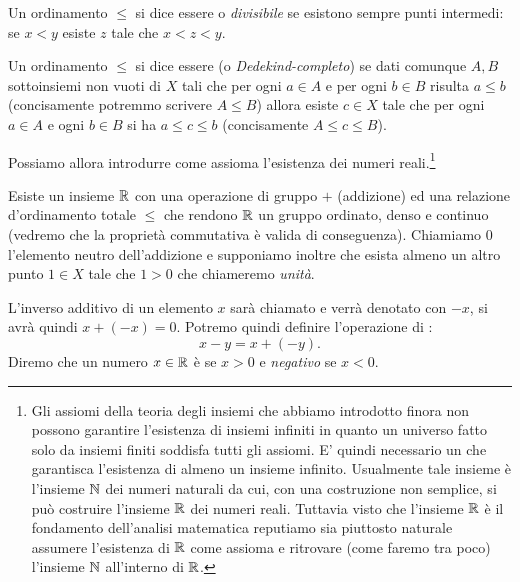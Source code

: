 \begin{definition}
  Un ordinamento $\le$ si dice essere
   o \emph{divisibile} 
  se esistono sempre punti intermedi:
  se $x<y$ esiste $z$ tale che $x < z < y$.
\end{definition}
  
\begin{definition}
  Un ordinamento $\le$ si dice essere
  (o \emph{Dedekind-completo})
  se dati comunque $A,B$ sottoinsiemi non vuoti di $X$
    tali che per ogni $a\in A$ e per ogni $b\in B$ risulta $a\le b$
    (concisamente potremmo scrivere $A\le B$)
    allora esiste $c\in X$ tale che per ogni $a\in A$ e ogni $b\in B$ 
    si ha $a\le c \le b$ (concisamente $A\le c \le B$).
\end{definition}
  
Possiamo allora introdurre come assioma l'esistenza dei 
numeri reali.\footnote{%
Gli assiomi della teoria degli insiemi che abbiamo introdotto finora 
non possono garantire l'esistenza di insiemi infiniti in quanto un 
universo fatto solo da insiemi finiti soddisfa tutti gli assiomi.
E' quindi necessario un  che garantisca 
l'esistenza di almeno un insieme infinito.
Usualmente tale insieme è l'insieme $\mathbb N$ dei numeri naturali da cui,
con una costruzione non semplice, si può costruire l'insieme $\mathbb R$ 
dei numeri reali. 
Tuttavia visto che l'insieme $\mathbb R$ è il fondamento dell'analisi matematica 
reputiamo sia piuttosto naturale assumere l'esistenza di $\mathbb R$ come assioma 
e ritrovare (come faremo tra poco) l'insieme $\mathbb N$ all'interno di $\mathbb R$.
}

\begin{axiom}
  Esiste un insieme $\mathbb R$ con una operazione di gruppo $+$ (addizione) 
  ed una relazione d'ordinamento 
  totale $\le$ che rendono $\mathbb R$ un gruppo ordinato, denso e continuo 
  (vedremo che la proprietà commutativa è valida di conseguenza).
  Chiamiamo $0$ l'elemento neutro dell'addizione e 
  supponiamo inoltre che esista almeno un altro punto $1\in X$ 
  tale che $1>0$ che chiameremo \emph{unità}. 
\end{axiom}

L'inverso additivo di un elemento $x$ sarà chiamato 
 e verrà denotato con $-x$, si avrà quindi $x + (-x) = 0$.
Potremo quindi definire l'operazione di :
\[
    x - y = x + (-y).
\]
Diremo che un numero $x\in \mathbb R$ è  
%
%
%
se $x>0$ e \emph{negativo} se $x<0$.

